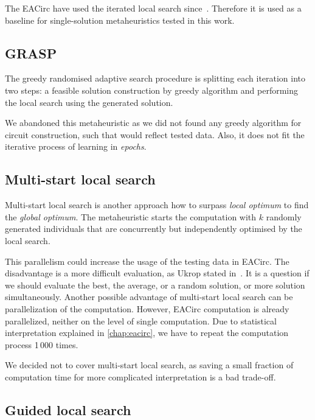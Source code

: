\documentclass[
  print, %
  Table,   %
  nolof,     %
  nolot,     %
  11pt, %
  oneside  %
]{fithesis3}
\begin{document}
The EACirc have used the iterated local search since~\cite{sys2014constructing}. Therefore it is used as a baseline for single-solution metaheuristics tested in this work.

\subsection{GRASP}
\label{subsec:opt-single-sol-grasp}

The greedy randomised adaptive search procedure is splitting each iteration into two steps: a feasible solution construction by greedy algorithm and performing the local search using the generated solution.

We abandoned this metaheuristic as we did not found any greedy algorithm for circuit construction, such that would reflect tested data. Also, it does not fit the iterative process of learning in \textit{epochs}.

\subsection{Multi-start local search}
\label{subsec:opt-single-sol-msls}

Multi-start local search is another approach how to surpass \textit{local optimum} to find the \textit{global optimum}. The metaheuristic starts the computation with $k$ randomly generated individuals that are concurrently but independently optimised by the local search.

This parallelism could increase the usage of the testing data in EACirc. The disadvantage is a more difficult evaluation, as Ukrop stated in~\cite[Chapter~5]{ukropBcThesis}. It is a question if we should evaluate the best, the average, or a random solution, or more solution simultaneously. Another possible advantage of multi-start local search can be parallelization of the computation. However, EACirc computation is already parallelized, neither on the level of single computation. Due to statistical interpretation explained in \cref{chap:eacirc}, we have to repeat the computation process 1\,000 times.

We decided not to cover multi-start local search, as saving a small fraction of computation time for more complicated interpretation is a bad trade-off.

\subsection{Guided local search}
\label{subsec:opt-single-sol-gls}
\end{document}
